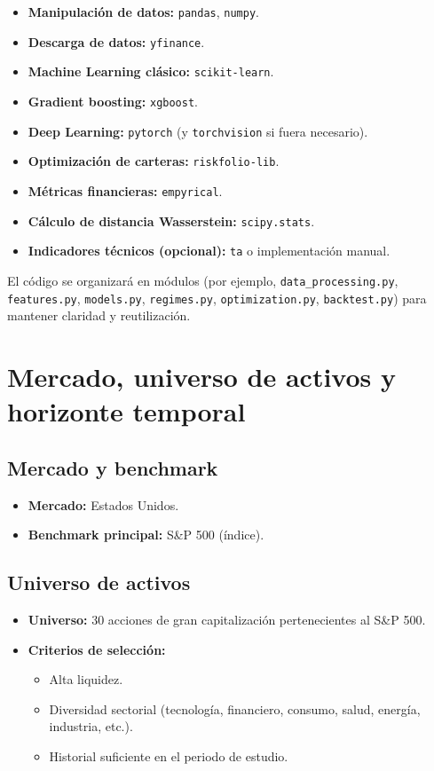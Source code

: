 \documentclass[12pt]{article}
\begin{document}
\begin{itemize}
    \item \textbf{Manipulación de datos:} \texttt{pandas}, \texttt{numpy}.
    \item \textbf{Descarga de datos:} \texttt{yfinance}.
    \item \textbf{Machine Learning clásico:} \texttt{scikit-learn}.
    \item \textbf{Gradient boosting:} \texttt{xgboost}.
    \item \textbf{Deep Learning:} \texttt{pytorch} (y \texttt{torchvision} si fuera necesario).
    \item \textbf{Optimización de carteras:} \texttt{riskfolio-lib}.
    \item \textbf{Métricas financieras:} \texttt{empyrical}.
    \item \textbf{Cálculo de distancia Wasserstein:} \texttt{scipy.stats}.
    \item \textbf{Indicadores técnicos (opcional):} \texttt{ta} o implementación manual.
\end{itemize}

El código se organizará en módulos (por ejemplo, \texttt{data\_processing.py}, \texttt{features.py}, \texttt{models.py}, \texttt{regimes.py}, \texttt{optimization.py}, \texttt{backtest.py}) para mantener claridad y reutilización.

\section{Mercado, universo de activos y horizonte temporal}

\subsection{Mercado y benchmark}

\begin{itemize}
    \item \textbf{Mercado:} Estados Unidos.
    \item \textbf{Benchmark principal:} S\&P 500 (índice).
\end{itemize}

\subsection{Universo de activos}

\begin{itemize}
    \item \textbf{Universo:} 30 acciones de gran capitalización pertenecientes al S\&P 500.
    \item \textbf{Criterios de selección:}
    \begin{itemize}
        \item Alta liquidez.
        \item Diversidad sectorial (tecnología, financiero, consumo, salud, energía, industria, etc.).
        \item Historial suficiente en el periodo de estudio.
    \end{itemize}
\end{itemize}
\end{document}
